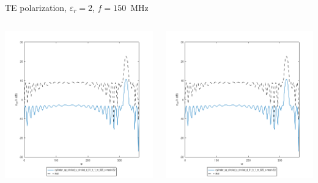 
\begin{frame}{TE polarization, $\varepsilon_r=2$, $f=150$\, MHz}

\begin{columns}

\includegraphics[width=\linewidth]{results/FF/cylD_01_H_1_M_025_X/epr2_TE_f150.png}


\includegraphics[width=\linewidth]{results/FF/cylD_01_H_1_M_025_Y/epr2_TE_f150.png}


\end{columns}
\end{frame}
